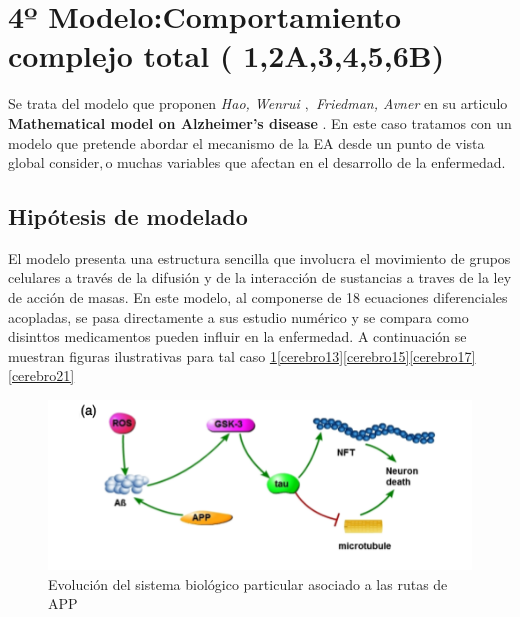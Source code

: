 \documentclass[1p]{elsarticle}
\begin{document}
\section{4º Modelo:Comportamiento complejo total ( 1,2A,3,4,5,6B)}
Se trata del modelo que proponen \textit{Hao, Wenrui $,$ Friedman, Avner} en su articulo \textbf{Mathematical model on Alzheimer’s disease} \cite{hao}. En este caso tratamos con un modelo que pretende abordar el mecanismo de la EA desde un punto de vista global consider$,$o muchas variables que afectan en el desarrollo de la enfermedad.

\subsection{Hipótesis de modelado} 
El modelo presenta una estructura sencilla que involucra el movimiento de grupos celulares a través de la difusión y de la interacción de sustancias a traves de la ley de acción de masas. En este modelo, al componerse de 18 ecuaciones diferenciales acopladas, se pasa directamente a sus estudio numérico y se compara como disinttos medicamentos pueden influir en la enfermedad.  A continuación se muestran figuras ilustrativas para tal caso \ref{cerebro11}\ref{cerebro13}\ref{cerebro15}\ref{cerebro17}\ref{cerebro21}

	\begin{figure}
		\includegraphics[scale=0.7]{primerdiagrama.png}
		\caption{Evolución del sistema biológico particular asociado a las rutas de APP}
		\label{cerebro11}
	\end{figure}
\end{document}
